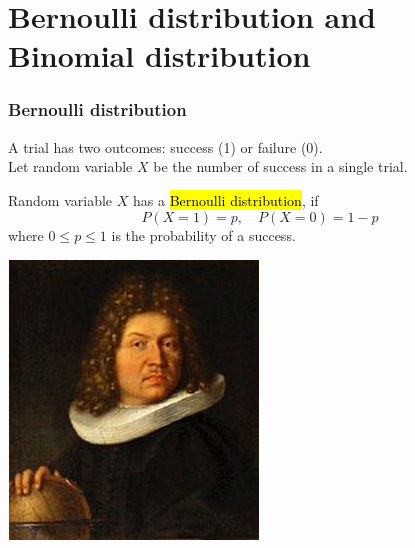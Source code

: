 \documentclass[slidestop,compress,mathserif]{beamer}
\begin{document}
\section{Bernoulli distribution and Binomial distribution}
\begin{frame}\frametitle{Bernoulli distribution}

A trial has two outcomes: success (1) or failure (0). \\
Let random variable $X$ be the number of success in a single trial.
\pause
\begin{defn}
Random variable $X$
has a \hl{Bernoulli distribution}, if
\[
P(X = 1) = p, \quad P(X = 0) = 1-p
\]
where $0 \leq p \leq 1$ is the probability of a success.
\end{defn}

\pause
{}
{
\begin{center}
\includegraphics[width = \textwidth]{figures/Jacob_Bernoulli}
\end{center}
}

\end{frame}
\end{document}
